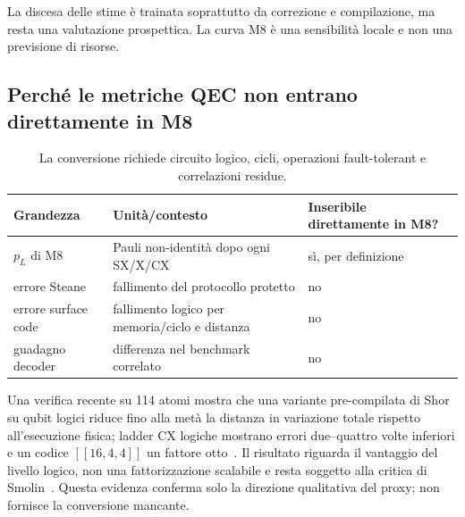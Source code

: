 \begin{onehalfspace}
La discesa delle stime è trainata soprattutto da correzione e
compilazione, ma resta una valutazione prospettica. La curva M8 è una
sensibilità locale e non una previsione di risorse.

\subsection{Perché le metriche QEC non entrano direttamente in M8}
\label{app:shor_metriche}

\begin{table}[H]

\centering
\small
\begin{tabular}{>{\raggedright\arraybackslash}p{}>{\raggedright\arraybackslash}p{}>{\raggedright\arraybackslash}p{}}
\toprule
\textbf{Grandezza} & \textbf{Unità/contesto} & \textbf{Inseribile direttamente in M8?} \\
\midrule
$p_L$ di M8 & Pauli non-identità dopo ogni SX/X/CX & sì, per definizione \\
\addlinespace[0.3em]
errore Steane & fallimento del protocollo protetto & no \\
\addlinespace[0.3em]
errore surface code & fallimento logico per memoria/ciclo e distanza & no \\
\addlinespace[0.3em]
guadagno decoder & differenza nel benchmark correlato & no \\
\bottomrule
\end{tabular}
\caption[Contratto tra risultati QEC e curva M8]{La conversione richiede
circuito logico, cicli, operazioni fault-tolerant e correlazioni residue.}\label{tab:decoder_su_shor}

\end{table}

Una verifica recente su 114 atomi mostra che una variante pre-compilata
di Shor su qubit logici riduce fino alla metà la distanza in variazione
totale rispetto all'esecuzione fisica; ladder CX logiche
mostrano errori due--quattro volte inferiori e un codice $[[16,4,4]]$ un
fattore otto~\cite{rines2025}. Il risultato riguarda il vantaggio del
livello logico, non una fattorizzazione scalabile e resta soggetto alla
critica di Smolin~\cite{smolin2013}. Questa evidenza conferma
solo la direzione qualitativa del proxy; non fornisce la conversione
mancante.

\end{onehalfspace}


